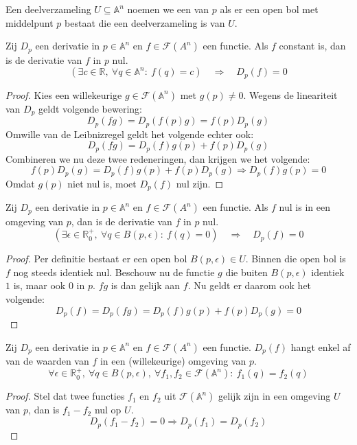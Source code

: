 \documentclass[main.tex]{subfiles}
\begin{document}
\begin{de}
  Een deelverzameling $U \subseteq \mathbb{A}^{n}$ noemen we een  van $p$ als er een open bol met middelpunt $p$ bestaat die een deelverzameling is van $U$.
\end{de}

\begin{lem}
  Zij $D_{p}$ een derivatie in $p\in\mathbb{A}^{n}$ en $f\in\mathcal{F}(A^{n})$ een functie.
  Als $f$ constant is, dan is de derivatie van $f$ in $p$ nul.
  \[ (\exists c\in\mathbb{R},\ \forall q\in\mathbb{A}^{n}:\ f(q) = c) \quad\Rightarrow\quad D_{p}(f) = 0 \]

  \begin{proof}
    Kies een willekeurige $g\in \mathcal{F}(\mathbb{A}^{n})$ met $g(p) \neq 0$.
    Wegens de lineariteit van $D_{p}$ geldt volgende bewering:
    \[ D_{p}(fg) = D_{p}(f(p)g) = f(p)D_{p}(g) \]
    Omwille van de Leibnizregel geldt het volgende echter ook:
    \[ D_{p}(fg) = D_{p}(f)g(p) + f(p)D_{p}(g) \]
    Combineren we nu deze twee redeneringen, dan krijgen we het volgende:
    \[ f(p)D_{p}(g) = D_{p}(f)g(p) + f(p)D_{p}(g) \Rightarrow D_{p}(f)g(p) = 0 \]
    Omdat $g(p)$ niet nul is, moet $D_{p}(f)$ nul zijn.
  \end{proof}
\end{lem}

\begin{lem}
  Zij $D_{p}$ een derivatie in $p\in\mathbb{A}^{n}$ en $f\in\mathcal{F}(A^{n})$ een functie.
  Als $f$ nul is in een omgeving van $p$, dan is de derivatie van $f$ in $p$ nul.
  \[ (\exists \epsilon\in\mathbb{R}^{+}_{0},\ \forall q \in B(p,\epsilon):\ f(q) = 0) \quad\Rightarrow\quad D_{p}(f) = 0 \]

  \begin{proof}
    Per definitie bestaat er een open bol $B(p,\epsilon) \in U$. Binnen die open bol is $f$ nog steeds identiek nul.
    Beschouw nu de functie $g$ die buiten $B(p,\epsilon)$ identiek $1$ is, maar ook $0$ in $p$.
    $fg$ is dan gelijk aan $f$.
    Nu geldt er daarom ook het volgende:
    \[ D_{p}(f) = D_{p}(fg) = D_{p}(f)g(p) + f(p)D_{p}(g) = 0 \]
  \end{proof}
\end{lem}

\begin{lem}
  Zij $D_{p}$ een derivatie in $p\in\mathbb{A}^{n}$ en $f\in\mathcal{F}(A^{n})$ een functie.
  $D_{p}(f)$ hangt enkel af van de waarden van $f$ in een (willekeurige) omgeving van $p$.
  \[ \forall \epsilon\in\mathbb{R}^{+}_{0},\ \forall q \in B(p,\epsilon),\ \forall f_{1},f_{2}\in\mathcal{F}(\mathbb{A}^{n}):\ f_{1}(q) = f_{2}(q) \]

  \begin{proof}
    Stel dat twee functies $f_{1}$ en $f_{2}$ uit $\mathcal{F}(\mathbb{A}^{n})$ gelijk zijn in een omgeving $U$ van $p$, dan is $f_{1}-f_{2}$ nul op $U$.
    \[ D_{p}(f_{1}-f_{2}) = 0 \Rightarrow D_{p}(f_{1}) = D_{p}(f_{2}) \]
  \end{proof}
\end{lem}
\end{document}
